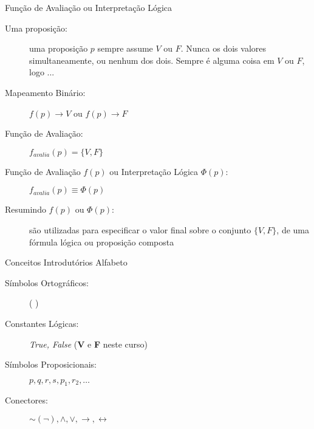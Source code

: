 \begin{frame}[t]{Função de Avaliação ou Interpretação Lógica} %
	


\begin{description}

\item[Uma proposição:]   uma proposição $p$ sempre assume $V$ ou $F$.  Nunca os
dois valores simultaneamente, ou nenhum dos dois. 
Sempre é alguma coisa em $V$ ou $F$, logo ...

  \item[Mapeamento Binário:]  $f(p) \to V$ ou  $f(p) \to F$
	
  \item[Função de Avaliação:] $f_{avalia}(p) = \{V, F\}$\\

\item[Função de Avaliação $f(p)$ ou Interpretação Lógica $\Phi(p)$:] $f_{avalia}(p) \equiv \Phi(p)$

\item[Resumindo $f(p)$ ou $\Phi(p)$:] são utilizadas  para especificar o valor final sobre o conjunto
 $\{V, F\}$,   de uma fórmula lógica ou proposição composta



	\end{description}
\end{frame}




\begin{frame}[t]{Conceitos Introdutórios} %
	Alfabeto
	\begin{description}
	  \item[Símbolos Ortográficos:] ( )
	  \item[Constantes Lógicas:] {\em True, False} ({\bf V} e {\bf F} neste curso)
	  \item[Símbolos Proposicionais:] $p, q, r, s, p_1, r_2, \ldots$
	  \item[Conectores:] $\sim (\neg), \wedge, \vee, \rightarrow, \leftrightarrow$
	\end{description}
\end{frame}

